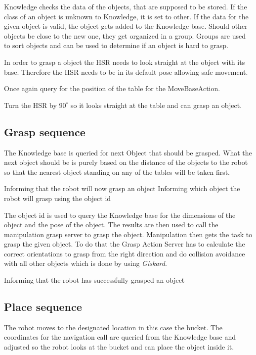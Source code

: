 \documentclass[main.tex]{subfiles}
\begin{document}
	Knowledge checks the data of the objects, that are supposed to be stored. If the class of an object is unknown to Knowledge, it is set to other. If the data for the given object is valid, the object gets added to the Knowledge base. Should other objects be close to the new one, they get organized in a group. Groups are used to sort objects and can be used to determine if an object is hard to grasp.
	
	In order to grasp a object the HSR needs to look straight at the object with its base. Therefore the HSR needs to be in its default pose allowing safe movement.
	
	
	Once again query for the position of the table for the MoveBaseAction.
	
	Turn the HSR by $90^\circ$ so it looks straight at the table and can grasp an object.
	
	\subsection{Grasp sequence}\label{clean_up_grasp_seq}
	
    The Knowledge base is queried for next Object that should be grasped.
	What the next object should be is purely based on the distance of the objects to the robot so that the nearest object standing on any of the tables will be taken first.
	
	Informing that the robot will now grasp an object
	Informing which object the robot will grasp using the object id
	
	The object id is used to query the Knowledge base for the dimensions of the object and the pose of the object. The results are then used to call the manipulation grasp server to grasp the object. Manipulation then gets the task to grasp the given object. To do that the Grasp Action Server has to calculate the correct orientations to grasp from the right direction and do collision avoidance with all other objects which is done by using \textit{Giskard}.
	 
	Informing that the robot has successfully grasped an object
    
	\subsection{Place sequence}
	The robot moves to the designated location in this case the bucket.
	The coordinates for the navigation call are queried from the Knowledge base and adjusted so the robot looks at the bucket and can place the object inside it. 
	
\end{document}
